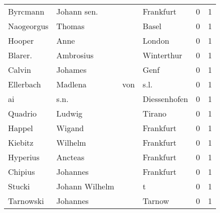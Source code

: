 \documentclass[10pt,a4paper,landscape]{article}
\begin{document}
\begin{longtable}{llllrr}
                 Byrcmann &                        Johann sen. &             &                                   Frankfurt &          0 &         1 \\
               Naogeorgus &                             Thomas &             &                                       Basel &          0 &         1 \\
                   Hooper &                               Anne &             &                                      London &          0 &         1 \\
                  Blarer. &                          Ambrosius &             &                                  Winterthur &          0 &         1 \\
                   Calvin &                            Johames &             &                                        Genf &          0 &         1 \\
                Ellerbach &                            Madlena &         von &                                        s.l. &          0 &         1 \\
                       ai &                               s.n. &             &                                Diessenhofen &          0 &         1 \\
                  Quadrio &                             Ludwig &             &                                      Tirano &          0 &         1 \\
                   Happel &                             Wigand &             &                                   Frankfurt &          0 &         1 \\
                  Kiebitz &                            Wilhelm &             &                                   Frankfurt &          0 &         1 \\
                 Hyperius &                            Ancteas &             &                                   Frankfurt &          0 &         1 \\
                  Chipius &                           Johannes &             &                                   Frankfurt &          0 &         1 \\
                   Stucki &                     Johann Wilhelm &             &                                           t &          0 &         1 \\
                Tarnowski &                           Johannes &             &                                      Tarnow &          0 &         1 \\

\end{longtable}
\end{document}
